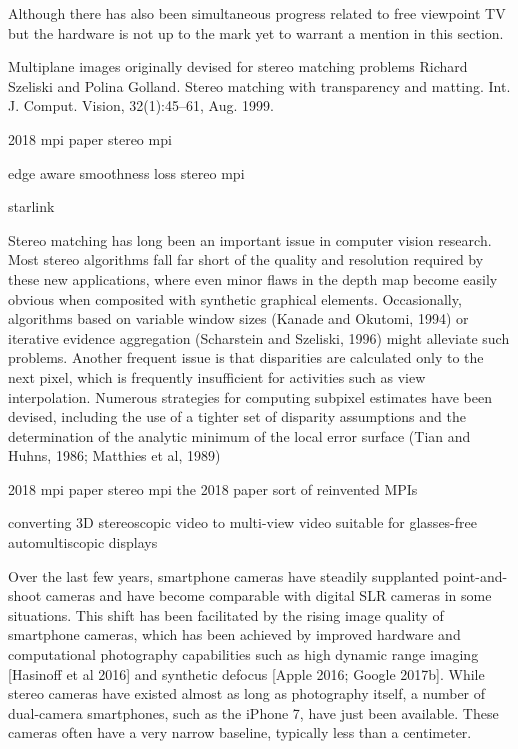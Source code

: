 Although there has also been simultaneous progress related to free viewpoint TV but the hardware is not up to the mark yet to warrant a mention in this section.

Multiplane images originally devised for stereo matching problems 
Richard Szeliski and Polina Golland. Stereo matching with
transparency and matting. Int. J. Comput. Vision, 32(1):45–61,
Aug. 1999.

2018 mpi paper
stereo mpi

edge aware smoothness loss
stereo mpi 






starlink

Stereo matching has long been an important issue in computer vision research.
Most stereo algorithms fall far short of the quality and resolution required by these new applications, where even minor flaws in the depth map become easily obvious when composited with synthetic graphical elements. Occasionally, algorithms based on variable window sizes (Kanade and Okutomi, 1994) or iterative evidence aggregation (Scharstein and Szeliski, 1996) might alleviate such problems. Another frequent issue is that disparities are calculated only to the next pixel, which is frequently insufficient for activities such as view interpolation. Numerous strategies for computing subpixel estimates have been devised, including the use of a tighter set of disparity assumptions and the determination of the analytic minimum of the local error surface (Tian and Huhns, 1986; Matthies et al, 1989)


2018 mpi paper
stereo mpi
the 2018 paper sort of reinvented MPIs

converting 3D stereoscopic video to multi-view video suitable for
glasses-free automultiscopic displays

Over the last few years, smartphone cameras have steadily supplanted point-and-shoot cameras and have become comparable with digital SLR cameras in some situations.
This shift has been facilitated by the rising image quality of smartphone cameras, which has been achieved by improved hardware and computational photography capabilities such as high dynamic range imaging [Hasinoff et al 2016] and synthetic defocus [Apple 2016; Google 2017b].
While stereo cameras have existed almost as long as photography itself, a number of dual-camera smartphones, such as the iPhone 7, have just been available.
These cameras often have a very narrow baseline, typically less than a centimeter.

